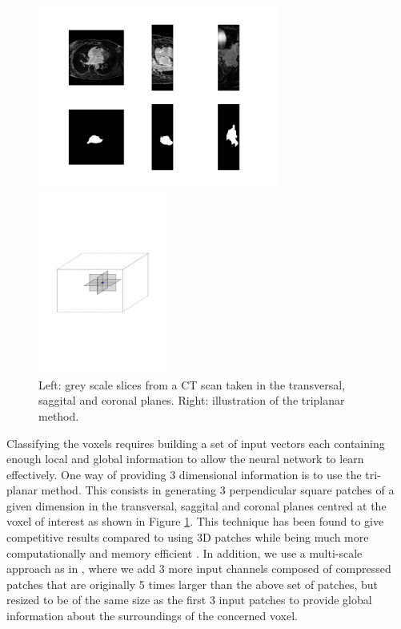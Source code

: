 \begin{figure}
\centering
\begin{minipage}{0.45\textwidth}
\centering
\includegraphics[trim=3cm 1.5cm 3cm 1.5cm, clip=true, height=60mm]{Chapter3/example_slice.png}
\end{minipage}\hfill
\begin{minipage}{0.45\textwidth}
\centering
\includegraphics[trim=2cm 8cm 2cm 8cm, clip=true, height=60mm]{Chapter3/triplanar.pdf}
\end{minipage}
\caption{Left: grey scale slices from a CT scan taken in the transversal, saggital and coronal planes. Right: illustration of the triplanar method.}
\label{tri-planar}
\end{figure}

\noindent Classifying the voxels requires building a set of input vectors each containing enough local and global information to allow the neural network to learn effectively. One way of providing 3 dimensional information is to use the tri-planar method. This consists in generating 3 perpendicular square patches of a given dimension in the transversal, saggital and coronal planes centred at the voxel of interest as shown in Figure \ref{tri-planar}. This technique has been found to give competitive results compared to using 3D patches while being much more computationally and memory efficient \citep{knee_cartilage}. In addition, we use a multi-scale approach as in \citep{DBLP:journals/corr/BrebissonM15}, where we add 3 more input channels composed of compressed patches that are originally 5 times larger than the above set of patches, but resized to be of the same size as the first 3 input patches to provide global information about the surroundings of the concerned voxel.\\

